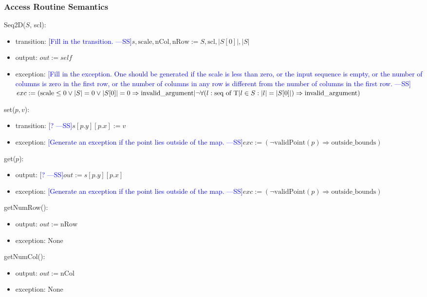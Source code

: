 \documentclass[12pt]{article}
\newcommand{\authornote}[3]{\textcolor{#1}{[#3 ---#2]}}
\newcommand{\authornote}[3]{}
\newcommand{\wss}[1]{\authornote{blue}{SS}{#1}}
\begin{document}
\subsubsection* {Access Routine Semantics}

Seq2D($S$, scl):
\begin{itemize}
\item transition: \wss{Fill in the transition.}$s, \mbox{scale}, \mbox{nCol}, \mbox{nRow} := S,
  \mbox{scl}, |S[0]|, |S|$
\item output: $\mathit{out} := \mathit{self}$
\item exception: \wss{Fill in the exception.  One should be generated if the
    scale is less than zero, or the input sequence is empty, or the number of
    columns is zero in the first row, or the number of columns in any row is
    different from the number of columns in the first row.}$exc := (\mbox{scale} \leq 0 \lor |S| = 0 \lor |S[0]| = 0 \Rightarrow \mbox{invalid\_argument}|\\
  \lnot\forall(l : \mbox{seq of T}|l \in S : |l| = |S[0]|) \Rightarrow
  \mbox{invalid\_argument})$
\end{itemize}

\noindent set($p, v$):
\begin{itemize}
\item transition: \wss{?}$s[p.y][p.x] := v$
\item exception: \wss{Generate an exception if the point lies outside of the
    map.}$exc := (\neg \mbox{validPoint}(p) \Rightarrow \mbox{outside\_bounds})$
\end{itemize}

\noindent get($p$):
\begin{itemize}
\item output: \wss{?}$out := s[p.y][p.x]$
\item exception: \wss{Generate an exception if the point lies outside of the
    map.}$exc := (\neg \mbox{validPoint}(p) \Rightarrow \mbox{outside\_bounds})$
\end{itemize}

\noindent getNumRow():
\begin{itemize}
\item output: $out := \mbox{nRow}$
\item exception: None
\end{itemize}

\noindent getNumCol():
\begin{itemize}
\item output: $out := \mbox{nCol}$
\item exception: None
\end{itemize}
\end{document}
